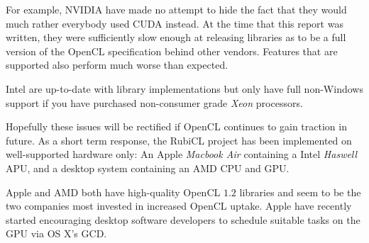  For example, NVIDIA have made no attempt to hide the fact that they would much rather everybody used \ac{CUDA} instead. At the time that this report was written, they were sufficiently slow enough at releasing libraries as to be a full version of the \ac{OpenCL} specification behind other vendors. Features that are supported also perform much worse than expected.

  Intel are up-to-date with library implementations but only have full non-Windows support if you have purchased non-consumer grade \emph{Xeon} processors.

  Hopefully these issues will be rectified if \ac{OpenCL} continues to gain traction in future. As a short term response, the RubiCL project has been implemented on well-supported hardware only: An Apple \emph{Macbook Air} containing a Intel \emph{Haswell} \ac{APU}, and a desktop system containing an \ac{AMD} \ac{CPU} and \ac{GPU}.

  Apple and \ac{AMD} both have high-quality \ac{OpenCL} $1.2$ libraries and seem to be the two companies most invested in increased \ac{OpenCL} uptake. Apple have recently started encouraging desktop software developers to schedule suitable tasks on the \ac{GPU} via OS X's \ac{GCD}.
